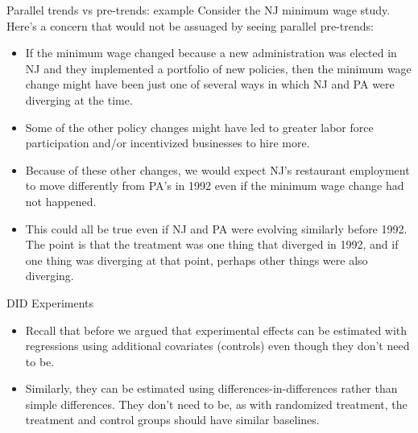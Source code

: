 \documentclass[aspectratio=169,11pt]{beamer}
\begin{document}
\begin{frame}{Parallel trends vs pre-trends: example}
Consider the NJ minimum wage study. Here's a concern that would not be assuaged by seeing parallel pre-trends:
\begin{itemize}
  \item  If the minimum wage changed 
  because a new administration was elected in NJ and they implemented a portfolio
  of new policies, then the minimum wage change might have been just one of several
  ways in which NJ and PA were diverging at the time.  
  
  \smallskip
  \item Some of the other policy changes might have led to greater labor force participation and/or
  incentivized businesses to hire more.
  
  \smallskip 
  \item Because of these other changes, we would expect NJ's restaurant employment to move
  differently from PA's in 1992 even if the minimum wage change had not happened.

  \smallskip
  \item This could all be true even if NJ and PA were evolving similarly before 1992. The point is that
    the treatment was one thing that diverged in 1992, and if one thing was diverging at that point,
    perhaps other things were also diverging. 
\end{itemize}
\end{frame}




\begin{frame}{DID Experiments}
\begin{itemize}
  \item Recall that before we argued that experimental
  effects can be estimated with regressions using additional
  covariates (controls) even though they don't need to be.

  \medskip
  \item Similarly, they can be estimated using differences-in-differences
  rather than simple differences. They don't need to be, as with
  randomized treatment, the treatment and control groups should have
  similar baselines.

\end{itemize}
\end{frame}
\end{document}
